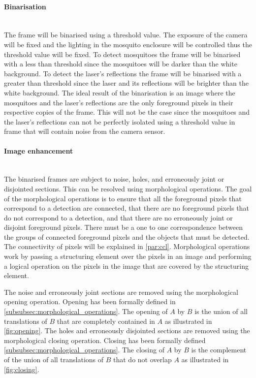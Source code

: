 \paragraph{Binarisation}\mbox{}\\
The frame will be binarised using a threshold value. The exposure of the camera will be fixed and the lighting in the mosquito enclosure will be controlled thus the threshold value will be fixed. To detect mosquitoes the frame will be binarised with a less than threshold since the mosquitoes will be darker than the white background. To detect the laser's reflections the frame will be binarised with a greater than threshold since the laser and its reflections will be brighter than the white background. The ideal result of the binarisation is an image where the mosquitoes and the laser's reflections are the only foreground pixels in their respective copies of the frame. This will not be the case since the mosquitoes and the laser's reflections can not be perfectly isolated using a threshold value in frame that will contain noise from the camera sensor.


\paragraph{Image enhancement}\mbox{}\\
The binarised frames are subject to noise, holes, and erroneously joint or disjointed sections. This can be resolved using morphological operations.
The goal of the morphological operations is to ensure that all the foreground pixels that correspond to a detection are connected, that there are no foreground pixels that do not correspond to a detection, and that there are no erroneously joint or disjoint foreground pixels. There must be a one to one correspondence between the groups of connected foreground pixels and the objects that must be detected. The connectivity of pixels will be explained in \autoref{par:ccl}. Morphological operations work by passing a structuring element over the pixels in an image and performing a logical operation on the pixels in the image that are covered by the structuring element.

The noise and erroneously joint sections are removed using the morphological opening operation. Opening has been formally defined in \autoref{subsubsec:morphological_operations}. The opening of $A$ by $B$ is the union of all translations of $B$ that are completely contained in $A$ as illustrated in \autoref{fig:opening}. The holes and erroneously disjointed sections are removed using the morphological closing operation. Closing has been formally defined \autoref{subsubsec:morphological_operations}. The closing of $A$ by $B$ is the complement of the union of all translations of $B$ that do not overlap $A$ as illustrated in \autoref{fig:closing}.

